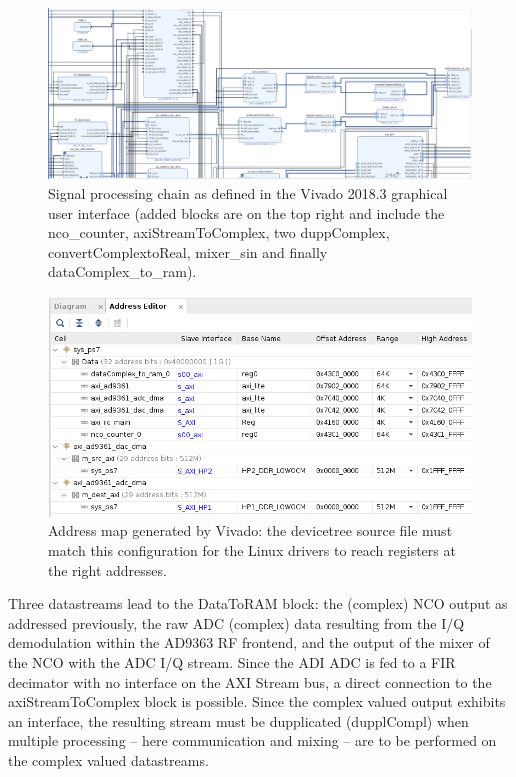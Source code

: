 \documentclass[12pt,oneside]{article}
\begin{document}
\begin{figure}[h!tb]
\includegraphics[width=\linewidth]{2.png}
\caption{Signal processing chain as defined in the Vivado 2018.3 graphical user
interface (added blocks are on the top right and include the nco\_counter, 
axiStreamToComplex, two duppComplex, convertComplextoReal, mixer\_sin and 
finally dataComplex\_to\_ram).}
\label{chain1}
\end{figure}

\begin{figure}[h!tb]
\includegraphics[width=\linewidth]{address.png}
\caption{Address map generated by Vivado: the devicetree source file must match
this configuration for the Linux drivers to reach registers at the right addresses.}
\label{chain2}
\end{figure}

Three datastreams lead to the DataToRAM block: the (complex) NCO output as addressed 
previously, the raw ADC (complex) data resulting from the I/Q demodulation within 
the AD9363 RF frontend, and the output of the mixer of the NCO with the ADC I/Q stream.
Since the ADI ADC is fed to a FIR decimator with no interface on the AXI Stream bus,
a direct connection to the axiStreamToComplex block is possible. Since the complex
valued output exhibits an interface, the resulting stream must be dupplicated 
(dupplCompl) when multiple processing -- here communication and mixing -- are to be
performed on the complex valued datastreams.
\end{document}
